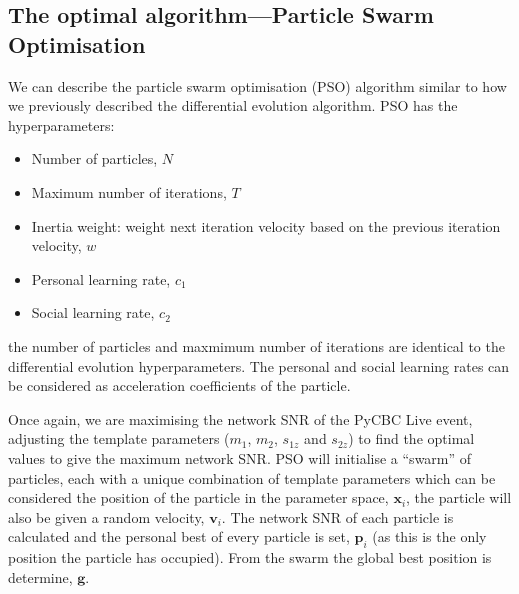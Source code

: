 \subsection{\label{7:sec:pso}The optimal algorithm---Particle Swarm Optimisation}

We can describe the particle swarm optimisation (PSO) algorithm similar to how we previously described the differential evolution algorithm. PSO has the hyperparameters:
%
\begin{itemize}
    \item Number of particles, $N$
    \item Maximum number of iterations, $T$
    \item Inertia weight: weight next iteration velocity based on the previous iteration velocity, $w$
    \item Personal learning rate, $c_{1}$
    \item Social learning rate, $c_{2}$
\end{itemize}
%
the number of particles and maxmimum number of iterations are identical to the differential evolution hyperparameters. The personal and social learning rates can be considered as acceleration coefficients of the particle.

Once again, we are maximising the network SNR of the PyCBC Live event, adjusting the template parameters ($m_{1}$, $m_{2}$, $s_{1z}$ and $s_{2z}$) to find the optimal values to give the maximum network SNR. PSO will initialise a ``swarm'' of particles, each with a unique combination of template parameters which can be considered the position of the particle in the parameter space, $\mathbf{x}_{i}$, the particle will also be given a random velocity, $\mathbf{v}_{i}$. The network SNR of each particle is calculated and the personal best of every particle is set, $\textbf{p}_{i}$ (as this is the only position the particle has occupied). From the swarm the global best position is determine, $\textbf{g}$.

